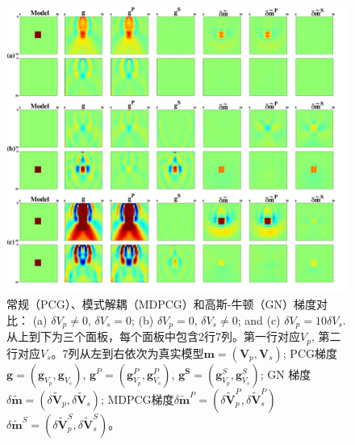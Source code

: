 \begin{figure}[!thb]
    \begin{center}
        \includegraphics[width=14cm]{Figure/chapter02/Hessiantest/Fig/newepsall.pdf}
        \caption{
			常规（PCG）、模式解耦（MDPCG）和高斯-牛顿（GN）梯度对比：
    (a) $\delta V_p \neq 0$, $\delta V_s=0$; (b) $\delta V_p=0$, $\delta V_s\neq0$; and (c)
    $\delta V_p=10 \delta V_s$.
	从上到下为三个面板，每个面板中包含2行7列。第一行对应$V_p$,
	第二行对应$V_s$。7列从左到右依次为真实模型$\mathbf{m}=(\mathbf{V}_p,
    \mathbf{V}_s)$;
    PCG梯度$\mathbf{g}=(\mathbf{g}_{V_p},\mathbf{g}_{V_s})$,
    $\mathbf{g}^P=(\mathbf{g}^P_{V_p},\mathbf{g}^P_{V_s})$,
    $\mathbf{g^S}=(\mathbf{g}^S_{V_p},\mathbf{g}^S_{V_s})$;
    GN 梯度$\delta
    \tilde{\mathbf{m}}=(\delta\tilde{\mathbf{V}}_p,\delta\tilde{\mathbf{V}}_s)$;
        MDPCG梯度$\delta
        \tilde{\mathbf{m}}^P=(\delta\tilde{\mathbf{V}}^P_p,\delta\tilde{\mathbf{V}}^P_s)$
         $\delta
        \tilde{\mathbf{m}}^S=(\delta\tilde{\mathbf{V}}^S_p,\delta\tilde{\mathbf{V}}^S_s)$。
    }
    \label{fig:all}
    \end{center}
\end{figure}

